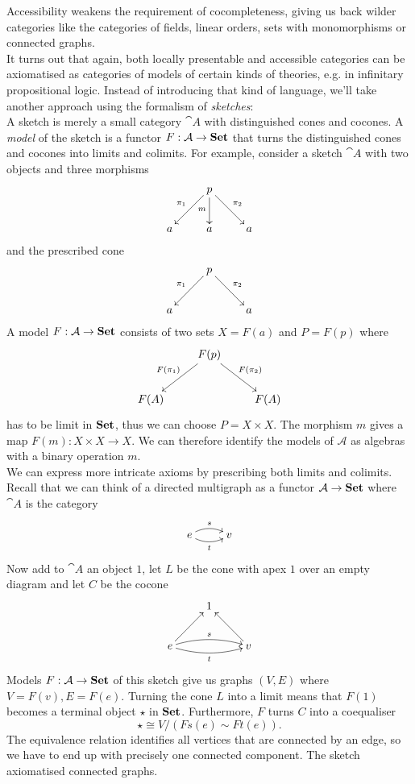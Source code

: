 Accessibility weakens the requirement of cocompleteness, giving us back wilder categories like the categories of fields, linear orders, sets with monomorphisms or connected graphs. \\

It turns out that again, both locally presentable and accessible categories can be axiomatised as categories of models of certain kinds of theories, e.g. in infinitary propositional logic. Instead of introducing that kind of language, we'll take another approach using the formalism of \emph{sketches}: \\

A sketch is merely a small category $\cat A$ with distinguished cones and cocones. A \emph{model} of the sketch is a functor $F : \mathcal{A} \to \mathbf{Set}$ that turns the distinguished cones and cocones into limits and colimits. For example, consider a sketch $\cat A$ with two objects and three morphisms
\[
\xymatrix{
  & p \ar[rd]^{\pi_2} \ar[d]_{m} \ar[ld]_{\pi_1} & \\
a & a & a
}\]
and the prescribed cone
\[
\xymatrix{
  & p \ar[rd]^{\pi_2} \ar[ld]_{\pi_1} & \\
a & & a
}\]
A model $F : \mathcal{A} \to \mathbf{Set}$ consists of two sets $X=F(a)$ and $P=F(p)$ where
\[
\xymatrix{
  & F(p) \ar[rd]^{F(\pi_2)} \ar[ld]_{F(\pi_1)} & \\
F(A) & & F(A)
}\]
has to be limit in $\mathbf{Set}$, thus we can choose $P = X \times X$. The morphism $m$ gives a map $F(m) : X \times X \to X$. We can therefore identify the models of $\mathcal A$ as algebras with a binary operation $m$. \\

We can express more intricate axioms by prescribing both limits and colimits. Recall that we can think of a directed multigraph as a functor $\mathcal{A} \to \mathbf{Set}$ where $\cat A$ is the category
\[
\xymatrix{
e \ar@/^/[r]^{s} \ar@/_/[r]_{t} & v
}\]
Now add to $\cat A$ an object $1$, let $L$ be the cone with apex $1$ over an empty diagram and let $C$ be the cocone \[
\xymatrix{
& 1 \\
e \ar@/^/[rr]^{s} \ar@/_/[rr]_{t} \ar[ru] & & v \ar[lu] \\
}\]
Models $F: \mathcal{A} \to \mathbf{Set}$ of this sketch give us graphs $(V,E)$ where $V=F(v),E=F(e)$. Turning the cone $L$ into a limit means that $F(1)$ becomes a terminal object $\star$ in $\mathbf{Set}$. Furthermore, $F$ turns $C$ into a coequaliser
\[ \star \cong V/(Fs(e)\sim Ft(e)). \]
The equivalence relation identifies all vertices that are connected by an edge, so we have to end up with precisely one connected component. The sketch axiomatised connected graphs. \\

